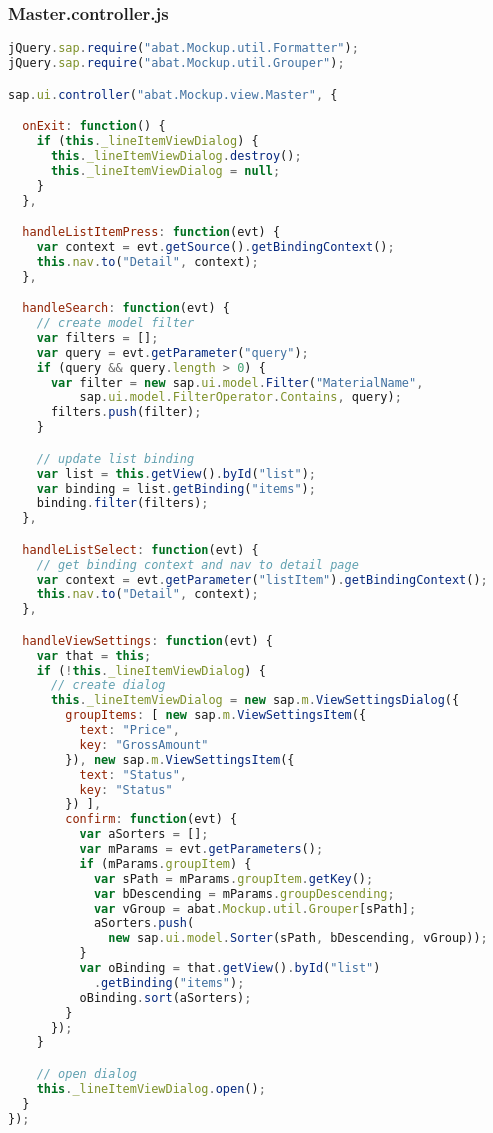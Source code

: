 \subsubsection*{Master.controller.js}
\begin{lstlisting}[language=JavaScript, label=lst:Master.controller.js]
jQuery.sap.require("abat.Mockup.util.Formatter");
jQuery.sap.require("abat.Mockup.util.Grouper");

sap.ui.controller("abat.Mockup.view.Master", {

  onExit: function() {
    if (this._lineItemViewDialog) {
      this._lineItemViewDialog.destroy();
      this._lineItemViewDialog = null;
    }
  },

  handleListItemPress: function(evt) {
    var context = evt.getSource().getBindingContext();
    this.nav.to("Detail", context);
  },

  handleSearch: function(evt) {
    // create model filter
    var filters = [];
    var query = evt.getParameter("query");
    if (query && query.length > 0) {
      var filter = new sap.ui.model.Filter("MaterialName",
          sap.ui.model.FilterOperator.Contains, query);
      filters.push(filter);
    }

    // update list binding
    var list = this.getView().byId("list");
    var binding = list.getBinding("items");
    binding.filter(filters);
  },

  handleListSelect: function(evt) {
    // get binding context and nav to detail page
    var context = evt.getParameter("listItem").getBindingContext();
    this.nav.to("Detail", context);
  },

  handleViewSettings: function(evt) {
    var that = this;
    if (!this._lineItemViewDialog) {
      // create dialog
      this._lineItemViewDialog = new sap.m.ViewSettingsDialog({
        groupItems: [ new sap.m.ViewSettingsItem({
          text: "Price",
          key: "GrossAmount"
        }), new sap.m.ViewSettingsItem({
          text: "Status",
          key: "Status"
        }) ],
        confirm: function(evt) {
          var aSorters = [];
          var mParams = evt.getParameters();
          if (mParams.groupItem) {
            var sPath = mParams.groupItem.getKey();
            var bDescending = mParams.groupDescending;
            var vGroup = abat.Mockup.util.Grouper[sPath];
            aSorters.push(
              new sap.ui.model.Sorter(sPath, bDescending, vGroup));
          }
          var oBinding = that.getView().byId("list")
            .getBinding("items");
          oBinding.sort(aSorters);
        }
      });
    }

    // open dialog
    this._lineItemViewDialog.open();
  }
});
\end{lstlisting}

